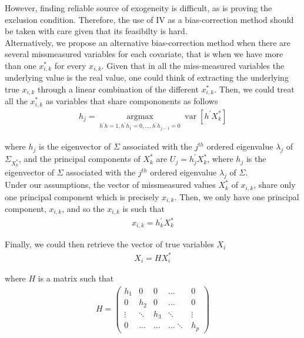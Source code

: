 \documentclass[12pt]{article}
\begin{document}
However, finding reliable source of exogeneity is difficult, as is proving the exclusion condition. Therefore, the use of IV as a bias-correction method should be taken with care given that its feasibilty is hard.\\

Alternatively, we propose an alternative bias-correction method when there are several missmeasured variables for each covariate, that is when we have more than one $x_{i,k}^*$ for every $x_{i,k}$. Given that in all the miss-measured variables the underlying value is the real value, one could think of extracting the underlying true $x_{i,k}$ through a linear combination of the different $x_{i,k}^*$. Then, we could treat all the $x_{i,k}^*$ as variables that share compononents as follows
\begin{align}
   h_{j}=\underset{h^{\prime} h=1, h^{\prime} h_{1}=0, \ldots, h^{\prime} h_{j-1}=0}{\operatorname{argmax}} \operatorname{var}\left[h^{\prime} X^*_k\right]  
\end{align}


where $h_j$ is the eigenvector of $\Sigma$ associated with the $j^{t h}$ ordered eigenvalue $\lambda_{j}$ of $\Sigma_{X^*_k}$, and the principal components of $X^*_k$ are $U_{j}=h_{j}^{\prime} X^*_k$, where $h_{j}$ is the eigenvector of $\Sigma$ associated with the $j^{t h}$ ordered eigenvalue $\lambda_{j}$ of $\Sigma$.\\

Under our assumptions, the vector of missmeasured values $X^*_k$ of $x_{i,k}$, share only one principal component which is precisely $x_{i,k}$. Then, we only have one principal component, $x_{i,k}$, and so the $x_{i,k}$ is such that
\begin{align}
    x_{i,k}=h_{k}^{\prime} X^*_k
\end{align}

Finally, we could then retrieve the vector of true variables $X_i$
\begin{align}
    X_i=HX^*_i
\end{align}

where $H$ is a matrix such that
\begin{align*}
    H=\left(\begin{array}{ccccc}
h_1 & 0 & 0 & \dots & 0 \\
0 & h_2 & 0 & \dots & 0 \\
\vdots & \ddots & h_3 & \ddots & \vdots \\
0 & \dots & \dots & \dots \ddots & h_p
\end{array}\right)
\end{align*}
\end{document}
